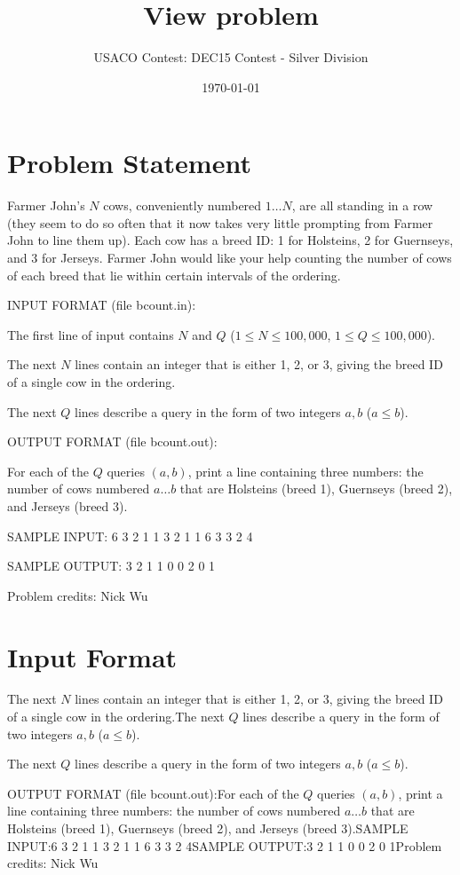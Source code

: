 \documentclass[12pt]{article}
\title{View problem}
\author{USACO Contest: DEC15 Contest - Silver Division}
\date{\today}
\begin{document}
\maketitle

\section*{Problem Statement}

Farmer John's $N$ cows, conveniently numbered $1 \ldots N$, are all standing in
a row (they seem to do so often that it now takes very little prompting from Farmer
John to line them up).  Each cow has a breed ID: 1 for Holsteins, 2 for
Guernseys, and 3 for Jerseys. Farmer John would like your help counting the
number of cows of each breed that lie within certain intervals of the ordering.

INPUT FORMAT (file bcount.in):

The first line of input contains $N$ and $Q$ ($1 \leq N \leq 100,000$,
$1 \leq Q \leq 100,000$).  

The next $N$ lines contain an integer that is either 1, 2, or 3, giving the 
breed ID of a single cow in the ordering.

The next $Q$ lines describe a query in the form of two integers $a, b$
($a \leq b$).


OUTPUT FORMAT (file bcount.out):

For each of the $Q$ queries $(a,b)$, print a line containing three numbers: the
number of cows numbered $a \ldots b$ that are Holsteins (breed 1), Guernseys
(breed 2), and Jerseys (breed 3).


SAMPLE INPUT:
6 3
2
1
1
3
2
1
1 6
3 3
2 4

SAMPLE OUTPUT: 
3 2 1
1 0 0
2 0 1

Problem credits: Nick Wu



\section*{Input Format}
The next $N$ lines contain an integer that is either 1, 2, or 3, giving the 
breed ID of a single cow in the ordering.The next $Q$ lines describe a query in the form of two integers $a, b$
($a \leq b$).

The next $Q$ lines describe a query in the form of two integers $a, b$
($a \leq b$).

OUTPUT FORMAT (file bcount.out):For each of the $Q$ queries $(a,b)$, print a line containing three numbers: the
number of cows numbered $a \ldots b$ that are Holsteins (breed 1), Guernseys
(breed 2), and Jerseys (breed 3).SAMPLE INPUT:6 3
2
1
1
3
2
1
1 6
3 3
2 4SAMPLE OUTPUT:3 2 1
1 0 0
2 0 1Problem credits: Nick Wu
\end{document}
